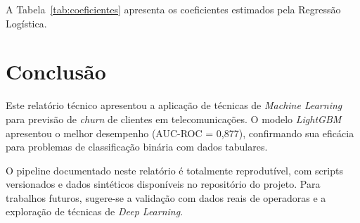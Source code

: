 \documentclass[
    article,
    12pt,
    oneside,
    a4paper,
    english,
    brazilian
    ]{abntex2}
\numberwithin{equation}{section}
\begin{document}


A Tabela~\ref{tab:coeficientes} apresenta os coeficientes estimados pela Regressão Logística.



\section{Conclusão}

Este relatório técnico apresentou a aplicação de técnicas de \textit{Machine Learning} para previsão de \textit{churn} de clientes em telecomunicações. O modelo \textit{LightGBM} apresentou o melhor desempenho (AUC-ROC = 0,877), confirmando sua eficácia para problemas de classificação binária com dados tabulares.

O pipeline documentado neste relatório é totalmente reprodutível, com scripts versionados e dados sintéticos disponíveis no repositório do projeto. Para trabalhos futuros, sugere-se a validação com dados reais de operadoras e a exploração de técnicas de \textit{Deep Learning}.



\end{document}
